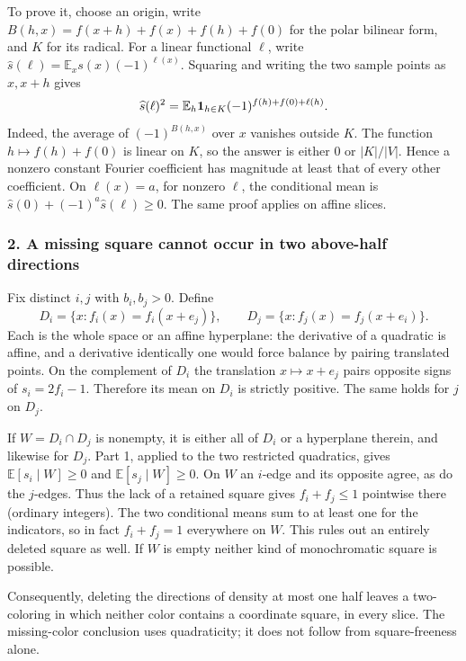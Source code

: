\documentclass[
  10pt,
]{article}
\begin{document}
To prove it, choose an origin, write \(B(h,x)=f(x+h)+f(x)+f(h)+f(0)\)
for the polar bilinear form, and \(K\) for its radical. For a linear
functional \(\ell\), write
\(\widehat s(\ell)=\mathbb E_x s(x)(-1)^{\ell(x)}\). Squaring and
writing the two sample points as \(x,x+h\) gives \[
\widehat s(\ell)^2=
\mathbb E_h{\bf1}_{h\in K}(-1)^{f(h)+f(0)+\ell(h)}.
\] Indeed, the average of \((-1)^{B(h,x)}\) over \(x\) vanishes outside
\(K\). The function \(h\mapsto f(h)+f(0)\) is linear on \(K\), so the
answer is either \(0\) or \(|K|/|V|\). Hence a nonzero constant Fourier
coefficient has magnitude at least that of every other coefficient. On
\(\ell(x)=a\), for nonzero \(\ell\), the conditional mean is
\(\widehat s(0)+(-1)^a\widehat s(\ell)\ge0\). The same proof applies on
affine slices.

\subsubsection{2. A missing square cannot occur in two above-half
directions}\label{a-missing-square-cannot-occur-in-two-above-half-directions}

Fix distinct \(i,j\) with \(b_i,b_j>0\). Define \[
D_i=\{x:f_i(x)=f_i(x+e_j)\},\qquad
D_j=\{x:f_j(x)=f_j(x+e_i)\}.
\] Each is the whole space or an affine hyperplane: the derivative of a
quadratic is affine, and a derivative identically one would force
balance by pairing translated points. On the complement of \(D_i\) the
translation \(x\mapsto x+e_j\) pairs opposite signs of \(s_i=2f_i-1\).
Therefore its mean on \(D_i\) is strictly positive. The same holds for
\(j\) on \(D_j\).

If \(W=D_i\cap D_j\) is nonempty, it is either all of \(D_i\) or a
hyperplane therein, and likewise for \(D_j\). Part 1, applied to the two
restricted quadratics, gives \(\mathbb E[s_i\mid W]\ge0\) and
\(\mathbb E[s_j\mid W]\ge0\). On \(W\) an \(i\)-edge and its opposite
agree, as do the \(j\)-edges. Thus the lack of a retained square gives
\(f_i+f_j\le1\) pointwise there (ordinary integers). The two conditional
means sum to at least one for the indicators, so in fact \(f_i+f_j=1\)
everywhere on \(W\). This rules out an entirely deleted square as well.
If \(W\) is empty neither kind of monochromatic square is possible.

Consequently, deleting the directions of density at most one half leaves
a two-coloring in which neither color contains a coordinate square, in
every slice. The missing-color conclusion uses quadraticity; it does not
follow from square-freeness alone.
\end{document}
